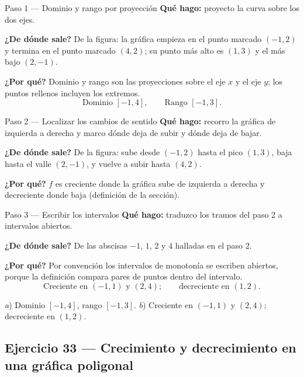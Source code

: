 \documentclass[11pt]{article}
\begin{document}
\begin{paso}{Paso 1 --- Dominio y rango por proyección}
\textbf{Qué hago:} proyecto la curva sobre los dos ejes.

\textbf{¿De dónde sale?} De la figura: la gráfica empieza en el punto marcado $(-1,2)$ y termina en el punto marcado $(4,2)$; su punto más alto es $(1,3)$ y el más bajo $(2,-1)$.

\textbf{¿Por qué?} Dominio y rango son las proyecciones sobre el eje $x$ y el eje $y$; los puntos rellenos incluyen los extremos.
\[
\text{Dominio } [-1,4], \qquad \text{Rango } [-1,3].
\]
\end{paso}

\begin{paso}{Paso 2 --- Localizar los cambios de sentido}
\textbf{Qué hago:} recorro la gráfica de izquierda a derecha y marco dónde deja de subir y dónde deja de bajar.

\textbf{¿De dónde sale?} De la figura: sube desde $(-1,2)$ hasta el pico $(1,3)$, baja hasta el valle $(2,-1)$, y vuelve a subir hasta $(4,2)$.

\textbf{¿Por qué?} $f$ es creciente donde la gráfica sube de izquierda a derecha y decreciente donde baja (definición de la sección).
\end{paso}

\begin{paso}{Paso 3 --- Escribir los intervalos}
\textbf{Qué hago:} traduzco los tramos del paso 2 a intervalos abiertos.

\textbf{¿De dónde sale?} De las abscisas $-1$, $1$, $2$ y $4$ halladas en el paso 2.

\textbf{¿Por qué?} Por convención los intervalos de monotonía se escriben abiertos, porque la definición compara pares de puntos dentro del intervalo.
\[
\text{Creciente en } (-1,1)\text{ y } (2,4); \qquad \text{decreciente en } (1,2).
\]
\end{paso}

\begin{resp}
\emph{a}) Dominio $[-1,4]$, rango $[-1,3]$. \quad
\emph{b}) Creciente en $(-1,1)$ y $(2,4)$; decreciente en $(1,2)$.
\end{resp}

\subsection*{Ejercicio 33 — Crecimiento y decrecimiento en una gráfica poligonal}
\end{document}
